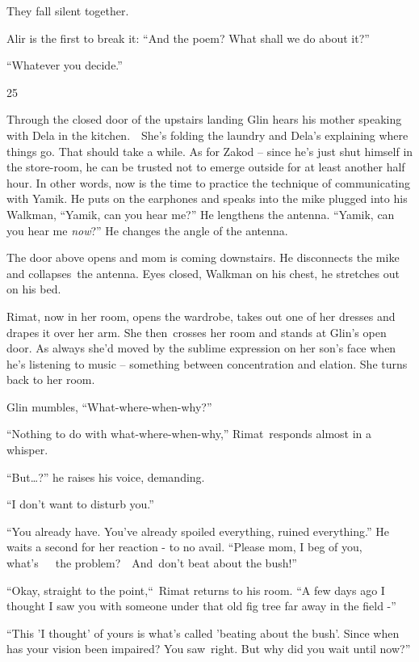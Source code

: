 \documentclass[twoside,11pt]{book}
\begin{document}
They fall silent together.

Alir is the first to break it: ``And the poem? What shall we do about it?'' 

``Whatever you decide.''


\bigskip

25~~

Through the closed door of the upstairs landing Glin hears his mother speaking with Dela in the kitchen.\ \ She's
folding the laundry and Dela's explaining where things go. That should take a while. As for Zakod -- since he's just
shut himself in the store-room, he can be trusted not to emerge outside for at least another half hour. In other words,
now is the time to practice the technique of communicating with Yamik. He puts on the earphones and speaks into the
mike plugged into his Walkman, ``Yamik, can you hear me?'' He lengthens the antenna.
``Yamik, can you hear me \textit{now}?'' He changes the angle of the antenna.

The door above opens and mom is coming downstairs. He disconnects the mike and collapses{\ }the antenna.
Eyes closed, Walkman on his chest, he stretches out on his bed.\ 

Rimat, now in her room, opens the wardrobe, takes out one of her dresses and drapes it over her arm. She then\ crosses
her room and stands at Glin's open door. As always she'd moved by the sublime expression on her son's face when he's
listening to music -- something between concentration and elation. She turns back to her room.

Glin mumbles, ``What-where-when{}-why?'' 

``Nothing to do with what-where-when-why,'' Rimat\ responds almost in a whisper. 

``But{\dots}?'' he raises his voice, demanding. 

``I don't want to disturb you.'' 

``You already have. You've already spoiled everything, ruined everything.'' He waits a second
for her reaction - to no avail. ``Please mom, I beg of you, what's\ \ \ the problem?\ \ And~don't beat
about the bush!''

``Okay, straight to the point,``\ Rimat returns to his room. ``A few days ago I
thought I saw you with someone under that old fig tree far away in the field -'' 

``This 'I thought' of yours is what's called {}'beating about the bush{}'. Since when has your vision been
impaired? You saw~right. But why did you wait until now?'' 
\end{document}
